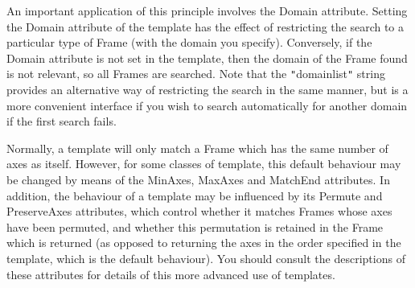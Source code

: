 \documentclass[twoside,11pt]{article}
\newcommand{\htmlref}[2]{#1}
\begin{document}
{{{         \sstitem
         An important application of this principle involves the Domain
         attribute. Setting the Domain attribute of the template has the
         effect of restricting the search to a particular type of Frame
         (with the domain you specify).  Conversely, if the Domain
         attribute is not set in the template, then the domain of the
         Frame found is not relevant, so all Frames are searched.  Note
         that the
         {\tt{"}}domainlist{\tt{"}} string provides an alternative way of restricting the
         search in the same manner, but is a more convenient interface if
         you wish to search automatically for another domain if the first
         search fails.

         \sstitem
         Normally, a template will only match a Frame which has the
         same number of axes as itself. However, for some classes of
         template, this default behaviour may be changed by means of the
         \htmlref{MinAxes}{MinAxes}, MaxAxes and \htmlref{MatchEnd}{MatchEnd} attributes. In addition, the
         behaviour of a template may be influenced by its Permute and
         PreserveAxes attributes, which control whether it matches Frames
         whose axes have been permuted, and whether this permutation is
         retained in the Frame which is returned (as opposed to returning
         the axes in the order specified in the template, which is the
         default behaviour). You should consult the descriptions of these
         attributes for details of this more advanced use of templates.
      }
   }
}
\end{document}
